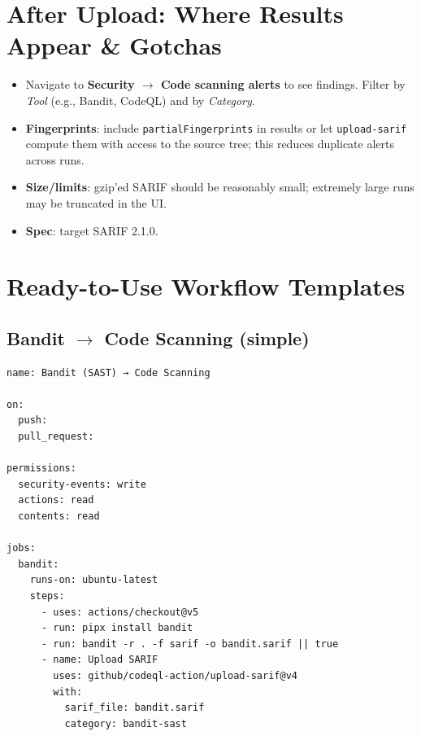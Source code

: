 \documentclass[11pt,a4paper]{article}
\newcommand{\term}[1]{\texttt{#1}}
\begin{document}
\section{After Upload: Where Results Appear \& Gotchas}
\begin{itemize}
  \item Navigate to \textbf{Security $\rightarrow$ Code scanning alerts} to see findings. Filter by \emph{Tool} (e.g., Bandit, CodeQL) and by \emph{Category}.
  \item \textbf{Fingerprints}: include \term{partialFingerprints} in results or let \term{upload-sarif} compute them with access to the source tree; this reduces duplicate alerts across runs.
  \item \textbf{Size/limits}: gzip'ed SARIF should be reasonably small; extremely large runs may be truncated in the UI.
  \item \textbf{Spec}: target SARIF 2.1.0.
\end{itemize}
\clearpage

\section{Ready-to-Use Workflow Templates}
\subsection{Bandit $\rightarrow$ Code Scanning (simple)}
\begin{verbatim}
name: Bandit (SAST) → Code Scanning

on:
  push:
  pull_request:

permissions:
  security-events: write
  actions: read
  contents: read

jobs:
  bandit:
    runs-on: ubuntu-latest
    steps:
      - uses: actions/checkout@v5
      - run: pipx install bandit
      - run: bandit -r . -f sarif -o bandit.sarif || true
      - name: Upload SARIF
        uses: github/codeql-action/upload-sarif@v4
        with:
          sarif_file: bandit.sarif
          category: bandit-sast
\end{verbatim}
\clearpage
\end{document}
